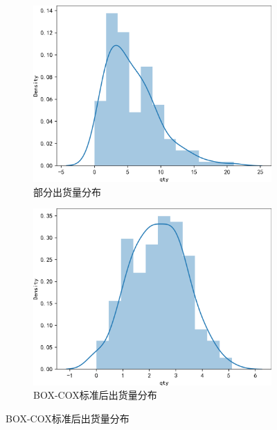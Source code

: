 \documentclass[withoutpreface,bwprint]{cumcmthesis}
\begin{document}
    \begin{figure}[htbp]
      \centering
        \begin{subfigure}{0.4\textwidth}
          \includegraphics[width=\textwidth]{figure/qty分布.png}
          \caption{部分出货量分布}
          \label{部分出货量分布}
        \end{subfigure}
        \begin{subfigure}{0.4\textwidth}
          \includegraphics[width=\textwidth]{figure/qty分布BOXCOX转换.png}
          \caption{BOX-COX标准后出货量分布}
          \label{BOX-COX标准后出货量分布}
        \end{subfigure}
    \end{figure}
\end{document}
